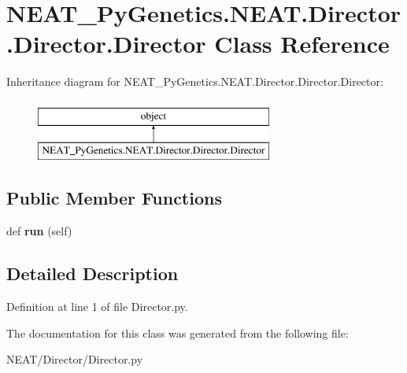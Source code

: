 \hypertarget{class_n_e_a_t___py_genetics_1_1_n_e_a_t_1_1_director_1_1_director_1_1_director}{}\section{N\+E\+A\+T\+\_\+\+Py\+Genetics.\+N\+E\+A\+T.\+Director.\+Director.\+Director Class Reference}
\label{class_n_e_a_t___py_genetics_1_1_n_e_a_t_1_1_director_1_1_director_1_1_director}
Inheritance diagram for N\+E\+A\+T\+\_\+\+Py\+Genetics.\+N\+E\+A\+T.\+Director.\+Director.\+Director\+:\begin{figure}[H]
\begin{center}
\leavevmode
\includegraphics[height=2.000000cm]{class_n_e_a_t___py_genetics_1_1_n_e_a_t_1_1_director_1_1_director_1_1_director}
\end{center}
\end{figure}
\subsection*{Public Member Functions}
\begin{DoxyCompactItemize}
\item 
def {\bfseries run} (self)\hypertarget{class_n_e_a_t___py_genetics_1_1_n_e_a_t_1_1_director_1_1_director_1_1_director_a2e4d16b66d8b60ec696d3c734a7e5833}{}\label{class_n_e_a_t___py_genetics_1_1_n_e_a_t_1_1_director_1_1_director_1_1_director_a2e4d16b66d8b60ec696d3c734a7e5833}

\end{DoxyCompactItemize}


\subsection{Detailed Description}


Definition at line 1 of file Director.\+py.



The documentation for this class was generated from the following file\+:\begin{DoxyCompactItemize}
\item 
N\+E\+A\+T/\+Director/Director.\+py\end{DoxyCompactItemize}
